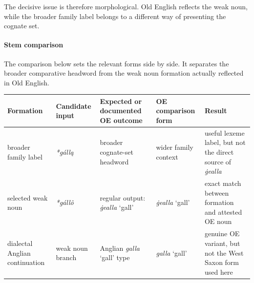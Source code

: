 \documentclass[
  british,
  a4paper,
]{article}
\newcounter{none} %
\begin{document}
The decisive issue is therefore morphological. Old English reflects the
weak noun, while the broader family label belongs to a different way of
presenting the cognate set.

\paragraph{Stem comparison}\label{stem-comparison}

The comparison below sets the relevant forms side by side. It separates
the broader comparative headword from the weak noun formation actually
reflected in Old English.

{\def\LTcaptype{none} %
\begin{longtable}[]{@{}
  >{\raggedright\arraybackslash}p{}
  >{\raggedright\arraybackslash}p{}
  >{\raggedright\arraybackslash}p{}
  >{\raggedright\arraybackslash}p{}
  >{\raggedright\arraybackslash}p{}@{}}
\toprule\noalign{}
\begin{minipage}[b]{\linewidth}\raggedright
Formation
\end{minipage} & \begin{minipage}[b]{\linewidth}\raggedright
Candidate input
\end{minipage} & \begin{minipage}[b]{\linewidth}\raggedright
Expected or documented OE outcome
\end{minipage} & \begin{minipage}[b]{\linewidth}\raggedright
OE comparison form
\end{minipage} & \begin{minipage}[b]{\linewidth}\raggedright
Result
\end{minipage} \\
\midrule\noalign{}
\endhead
\bottomrule\noalign{}
\endlastfoot
broader family label & {\emph{*gállą}} & broader cognate-set headword &
wider family context & useful lexeme label, but not the direct source of
\emph{ġealla} \\
selected weak noun & {\emph{*gállô}} & regular output: {\emph{ġealla}}
`gall' & {\emph{ġealla}} `gall' & exact match between formation and
attested OE noun \\
dialectal Anglian continuation & weak noun branch & Anglian
{\emph{galla}} `gall' type & {\emph{galla}} `gall' & genuine OE variant,
but not the West Saxon form used here \\
\end{longtable}
}
\end{document}
